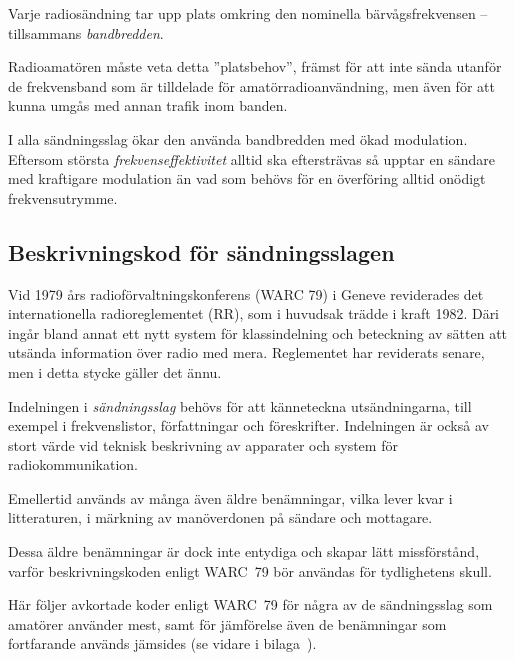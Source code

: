 Varje radiosändning tar upp plats omkring den nominella bärvågsfrekvensen --
tillsammans \emph{bandbredden}.

Radioamatören måste veta detta ''platsbehov'', främst för att inte sända utanför
de frekvensband som är tilldelade för amatörradioanvändning, men även för att
kunna umgås med annan trafik inom banden.

I alla sändningsslag ökar den använda bandbredden med ökad modulation.
Eftersom största \emph{frekvenseffektivitet} alltid ska eftersträvas så upptar
en sändare med kraftigare modulation än vad som behövs för en överföring alltid
onödigt frekvensutrymme.

\subsection{Beskrivningskod för sändningsslagen}
\label{modulation_beskrivningskod}

Vid 1979 års radioförvaltningskonferens (WARC 79) i Geneve reviderades det
internationella radioreglementet (RR), som i huvudsak trädde i kraft 1982.
Däri ingår bland annat ett nytt system för klassindelning och beteckning av
sätten att utsända information över radio med mera.
Reglementet har reviderats senare, men i detta stycke gäller det ännu.

Indelningen i \emph{sändningsslag} behövs för att känneteckna utsändningarna,
till exempel i frekvenslistor, författningar och föreskrifter.
Indelningen är också av stort värde vid teknisk beskrivning av apparater och
system för radiokommunikation.

Emellertid används av många även äldre benämningar, vilka lever kvar i
litteraturen, i märkning av manöverdonen på sändare och mottagare.

Dessa äldre benämningar är dock inte entydiga och skapar lätt missförstånd,
varför beskrivningskoden enligt WARC~79 bör användas för tydlighetens skull.

Här följer avkortade koder enligt WARC~79 för några av de sändningsslag som
amatörer använder mest, samt för jämförelse även de benämningar som fortfarande
används jämsides (se vidare i bilaga~).


